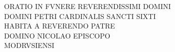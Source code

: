 \documentclass[a5paper,twoside]{article}
\begin{document}
\frenchspacing

\fontsize{11}{13.2}
\selectfont

\linespread{1.1}

\thispagestyle{empty}


\beginnumbering
\autopar


\pstart

{\centering

\noindent ORATIO IN FVNERE REVERENDISSIMI DOMINI \\
DOMINI PETRI CARDINALIS SANCTI SIXTI \\
HABITA A REVERENDO PATRE \\
DOMINO NICOLAO 
EPISCOPO \\
MODRVSIENSI

}

\pend


\bigskip
\end{document}
